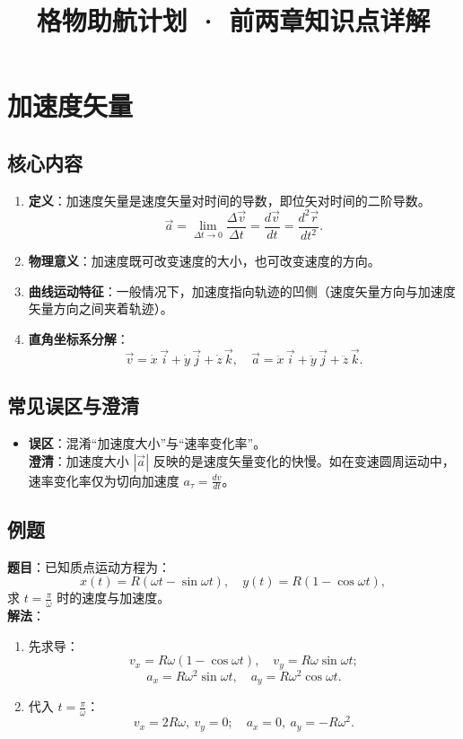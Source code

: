 \documentclass[UTF8]{ctexart}
\title{格物助航计划 · 前两章知识点详解}
\author{}
\date{}
\begin{document}
	\maketitle
	
	\section{加速度矢量}
	\subsection*{核心内容}
	\begin{enumerate}
		\item \textbf{定义}：加速度矢量是速度矢量对时间的导数，即位矢对时间的二阶导数。
		\[
		\vec{a} = \lim_{\Delta t \to 0} \frac{\Delta \vec{v}}{\Delta t} = \frac{d\vec{v}}{dt} = \frac{d^2 \vec{r}}{dt^2}.
		\]
		\item \textbf{物理意义}：加速度既可改变速度的大小，也可改变速度的方向。
		\item \textbf{曲线运动特征}：一般情况下，加速度指向轨迹的凹侧（速度矢量方向与加速度矢量方向之间夹着轨迹）。
		\item \textbf{直角坐标系分解}：
		\[
		\vec{v} = \dot{x}\,\vec{i} + \dot{y}\,\vec{j} + \dot{z}\,\vec{k},\quad
		\vec{a} = \ddot{x}\,\vec{i} + \ddot{y}\,\vec{j} + \ddot{z}\,\vec{k}.
		\]
	\end{enumerate}
	
	\subsection*{常见误区与澄清}
	\begin{itemize}
		\item \textbf{误区}：混淆“加速度大小”与“速率变化率”。\\
		\textbf{澄清}：加速度大小 $|\vec{a}|$ 反映的是速度矢量变化的快慢。如在变速圆周运动中，速率变化率仅为切向加速度 $a_\tau = \frac{dv}{dt}$。
	\end{itemize}
	
	\subsection*{例题}
	\textbf{题目}：已知质点运动方程为：
	\[
	x(t) = R(\omega t - \sin\omega t),\quad y(t) = R(1 - \cos\omega t),
	\]
	求 $t = \frac{\pi}{\omega}$ 时的速度与加速度。\\
	\textbf{解法}：
	\begin{enumerate}
		\item 先求导：
		\[
		v_x = R\omega(1 - \cos\omega t),\quad v_y = R\omega\sin\omega t;
		\]
		\[
		a_x = R\omega^2\sin\omega t,\quad a_y = R\omega^2\cos\omega t.
		\]
		\item 代入 $t = \frac{\pi}{\omega}$：
		\[
		v_x = 2R\omega,\ v_y = 0;\quad a_x = 0,\ a_y = -R\omega^2.
		\]
	\end{enumerate}
	
\end{document}
